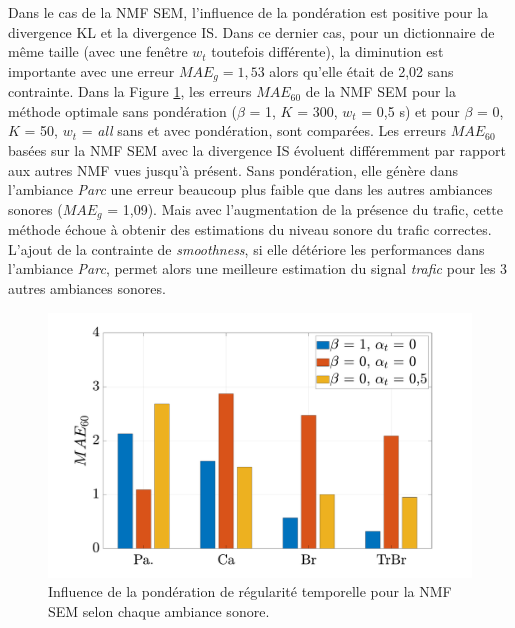 Dans le cas de la NMF SEM, l'influence de la pondération est positive pour la divergence KL et la divergence IS. Dans ce dernier cas, pour un dictionnaire de même taille (avec une fenêtre $w_t$ toutefois différente), la diminution est importante avec une erreur $MAE_g = 1,53$ alors qu'elle était de 2,02 sans contrainte. 
Dans la Figure \ref{fig:smoothMAE60}, les erreurs $MAE_{60}$ de la NMF SEM pour la méthode optimale sans pondération ($\beta$ = 1, $K$ = 300, $w_t$ = 0,5 s) et pour $\beta$ = 0, $K$ = 50, $w_t$ = \textit{all} sans et avec pondération, sont comparées. Les erreurs $MAE_{60}$ basées sur la NMF SEM avec la divergence IS évoluent différemment par rapport aux autres NMF vues jusqu'à présent. Sans pondération, elle génère dans l'ambiance \textit{Parc} une erreur beaucoup plus faible que dans les autres ambiances sonores ($MAE_g$ = 1,09). Mais avec l'augmentation de la présence du trafic, cette méthode échoue à obtenir des estimations du niveau sonore du trafic correctes. L'ajout de la contrainte de \textit{smoothness}, si elle détériore les performances dans l'ambiance \textit{Parc}, permet alors une meilleure estimation du signal \textit{trafic} pour les 3 autres ambiances sonores.

\begin{figure}[h!]
\centering
\includegraphics[width=.9\linewidth]{./figures/resultats/grafic_smooth_bar.pdf}
\caption{Influence de la pondération de régularité temporelle pour la NMF SEM selon chaque ambiance sonore.}
\label{fig:smoothMAE60}
\end{figure}

